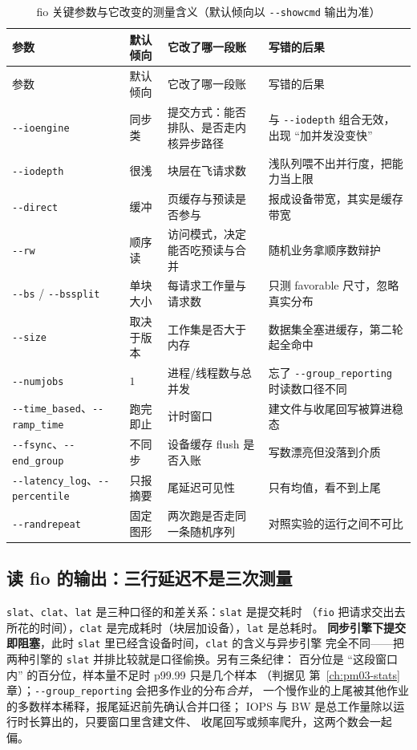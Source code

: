 \documentclass[12pt,a4paper,fontset=fandol]{ctexbook}
\newcommand{\Tp}[1]{\texttt{#1}}
\newcommand{\Opt}[1]{\texttt{-\/-#1}}
\newcommand{\Bk}{\discretionary{}{}{}}
\newcommand{\Mx}[1]{\textsf{#1}}
\begin{document}
\begin{longtable}{>{\raggedright\arraybackslash}p{} >{\raggedright\arraybackslash}p{} >{\raggedright\arraybackslash}p{} >{\raggedright\arraybackslash}p{}}
\caption{fio 关键参数与它改变的测量含义（默认倾向以 \Opt{showcmd} 输出为准）}\label{tab:pm08-fio-param}\\
\toprule
参数 & 默认倾向 & 它改了哪一段账 & 写错的后果 \\
\midrule
\endfirsthead
\toprule
参数 & 默认倾向 & 它改了哪一段账 & 写错的后果 \\
\midrule
\endhead
\bottomrule
\endfoot
\Opt{ioengine} & 同步类 & 提交方式：能否排队、是否走内核异步路径 & 与 \Opt{iodepth} 组合无效，出现 ``加并发没变快'' \\
\Opt{iodepth} & 很浅 & 块层在飞请求数 & 浅队列喂不出并行度，把能力当上限 \\
\Opt{direct} & 缓冲 & 页缓存与预读是否参与 & 报成设备带宽，其实是缓存带宽 \\
\Opt{rw} & 顺序读 & 访问模式，决定能否吃预读与合并 & 随机业务拿顺序数辩护 \\
\Opt{bs} / \Opt{bssplit} & 单块大小 & 每请求工作量与请求数 & 只测 favorable 尺寸，忽略真实分布 \\
\Opt{size} & 取决于版本 & 工作集是否大于内存 & 数据集全塞进缓存，第二轮起全命中 \\
\Opt{numjobs} & $1$ & 进程/线程数与总并发 & 忘了 \Opt{group{\Bk}\_reporting} 时读数口径不同 \\
\Opt{time{\Bk}\_based}、\Opt{ramp{\Bk}\_time} & 跑完即止 & 计时窗口 & 建文件与收尾回写被算进稳态 \\
\Opt{fsync}、\Opt{end{\Bk}\_group} & 不同步 & 设备缓存 flush 是否入账 & 写数漂亮但没落到介质 \\
\Opt{latency{\Bk}\_log}、\Opt{percentile} & 只报摘要 & 尾延迟可见性 & 只有均值，看不到上尾 \\
\Opt{randrepeat} & 固定图形 & 两次跑是否走同一条随机序列 & 对照实验的运行之间不可比 \\
\end{longtable}

\subsection{读 fio 的输出：三行延迟不是三次测量}
\label{sub:pm08-fio-out}

\Tp{slat}、\Tp{clat}、\Tp{lat} 是三种口径的和差关系：\Tp{slat} 是提交耗时
（\Tp{fio} 把请求交出去所花的时间），\Tp{clat} 是完成耗时（块层加设备），\Tp{lat} 是总耗时。
\textbf{同步引擎下提交即阻塞}，此时 \Tp{slat} 里已经含设备时间，\Tp{clat} 的含义与异步引擎
完全不同——把两种引擎的 \Tp{slat} 并排比较就是口径偷换。另有三条纪律：
百分位是 ``这段窗口内'' 的百分位，样本量不足时 \Mx{p99.99} 只是几个样本
（判据见 第~\ref{ch:pm03-stats} 章）；\Opt{group\_reporting} 会把多作业的分布\emph{合并}，
一个慢作业的上尾被其他作业的多数样本稀释，报尾延迟前先确认合并口径；
\Mx{IOPS} 与 \Mx{BW} 是总工作量除以运行时长算出的，只要窗口里含建文件、
收尾回写或频率爬升，这两个数会一起偏。
\end{document}
